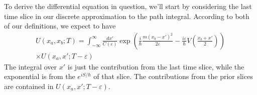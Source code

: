 To derive the differential equation in question, we'll start by
considering the last time slice in our discrete approximation to
the path integral. According to both of our definitions, we
expect to have
\begin{equation}\label{eq:lastTimeSlice}
\begin{split}
U(x_a,x_b;T) = \int^{\infty}_{-\infty}\frac{dx'}{C(\varepsilon)}
\exp\left(\frac{i}{\hbar}\frac{m(x_b-x')^{2}}{2\varepsilon}-\frac{i\varepsilon}{\hbar}
V\left(\frac{x_{b}+x'}{2}\right)\right)\\
\times{U(x_a,x';T-\varepsilon)}
\end{split}
\end{equation}
The integral over $x'$ is just the contribution from the last
time slice, while the exponential is from the $e^{iS/\hbar}$ of
that slice. The contributions from the prior slices are contained
in $U(x_a,x';T-\varepsilon)$.

